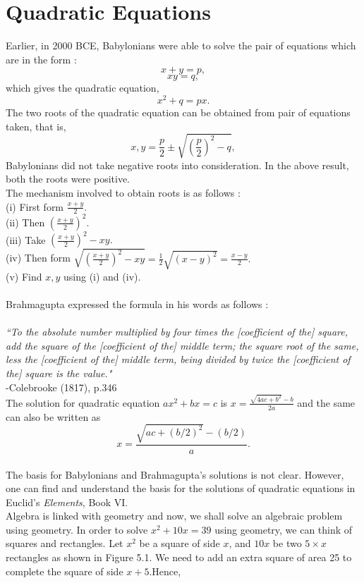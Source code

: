 \documentclass[a4paper,reqno,11pt]{amsart}
\theoremstyle{plain}%
\theoremstyle{definition}
\theoremstyle{remark}
\begin{document}
\section{Quadratic Equations}
Earlier, in 2000 BCE, Babylonians were able to solve the pair of equations which are in the form :\\
$$x + y = p,$$
$$xy = q,$$
which gives the quadratic equation,\\
$$x^2 + q = px.$$
The two roots of the quadratic equation can be obtained from pair of equations taken, that is,\\
$$x,y = \frac{p}{2} \pm \sqrt{\left(\frac{p}{2}\right)^2 - q},$$
Babylonians did not take negative roots into consideration. In the above result, both the roots were positive.\\
The mechanism involved to obtain roots is as follows :\\
(i) First form $\frac{x+y}{2}.$\\
(ii) Then $\left(\frac{x+y}{2}\right)^2.$\\
(iii) Take $\left(\frac{x+y}{2}\right)^2 - xy.$\\
(iv) Then form $\sqrt{\left(\frac{x+y}{2}\right)^2 - xy} = \frac{1}{2}\sqrt{(x-y)^2} = \frac{x-y}{2}.$\\
(v) Find $x, y$ using (i) and (iv).\\
\\
Brahmagupta expressed the formula in his words as follows :\\
\\
\indent \textit{``To the absolute number multiplied by four times the [coefficient of the] square, add the square of the [coefficient of the]
middle term; the square root of the same, less the [coefficient
of the] middle term, being divided by twice the [coefficient of
the] square is the value."}\cite{ref 1}\\
\vspace{2ex}
\hfill {-Colebrooke (1817), p.346}\\
The solution for quadratic equation $ax^2 + bx = c$ is $x = \frac{\sqrt{4ac + b^2} - b}{2a}$ and the same can also be written as\\
$$x = \frac{\sqrt{ac + (b/2)^2} - (b/2)}{a}.$$
\\
The basis for Babylonians and Brahmagupta's solutions is not clear. However, one can find and understand the basis for the solutions of quadratic equations in Euclid’s \textit{Elements}, Book VI.\\
\indent Algebra is linked with geometry and now, we shall solve an algebraic problem using geometry. In order to solve $x^2 + 10x = 39$ using geometry, we can think of squares and rectangles. Let $x^2$ be a square of side $x$, and $10x$ be two $5 \times x$ rectangles as shown in Figure 5.1. We need to add an extra square of area 25 to complete the square of side $x + 5$.Hence,
\end{document}
